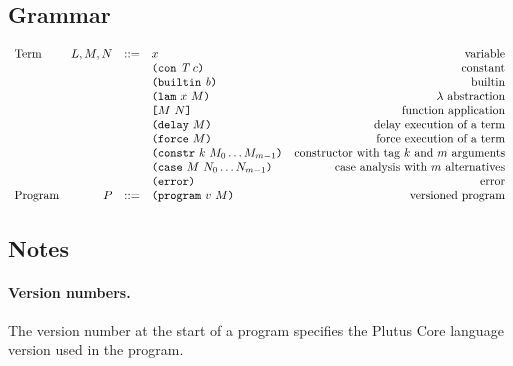 \subsection{Grammar}
\begin{minipage}{\linewidth}
    \centering
    \[\begin{array}{lrclr}
    \textrm{Term}       & L,M,N  & ::= & x                               & \textrm{variable}\\
                        &        &     & \texttt{(} \texttt{con} ~ \textit{T} ~ c \texttt{)}                    & \textrm{constant}\\
                        &        &     & \texttt{(} \texttt{builtin} ~ \mathit{b} \texttt{)}                     & \textrm{builtin}\\
                        &        &     & \texttt{(} \texttt{lam} ~ x ~ M  \texttt{)}                     & \textrm{$\lambda$ abstraction}\\
                        &        &     & \texttt{[} M ~ N \texttt{]}                     & \textrm{function application}\\
                        &        &     & \texttt{(} \texttt{delay} ~ M \texttt{)}                       & \textrm{delay execution of a term}\\
                        &        &     & \texttt{(} \texttt{force} ~ M \texttt{)}                       & \textrm{force execution of a term}\\
                        &        &     & \texttt{(} \texttt{constr} ~ k ~ M_0 \ldots M_{m-1} \texttt{)}   & \textrm{constructor with tag $k$ and $m$ arguments}\\
                        &        &     & \texttt{(} \texttt{case} ~ M ~ N_0 \ldots N_{m-1} \texttt{)}     & \textrm{case analysis with $m$ alternatives}\\
                        &        &     & \texttt{(} \texttt{error} \texttt{)}                         & \textrm{error}\\
        \textrm{Program}& P      & ::= & \texttt{(} \texttt{program} ~ v ~ M \texttt{)}                  & \textrm{versioned program}

    \end{array}\]
    \label{fig:untyped-grammar}
\end{minipage}


\subsection{Notes}
\label{sec:grammar-notes}
\paragraph{Version numbers.} The version number at the start of a program specifies
the Plutus Core language version used in the program.

